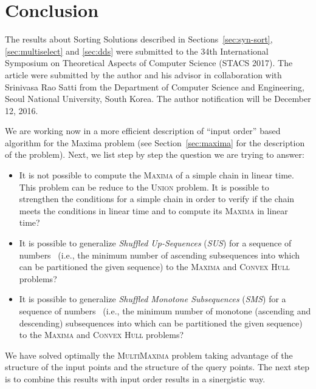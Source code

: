 \section{Conclusion}
\label{sec:con}


The results about Sorting Solutions described in
Sections~\ref{sec:syn-sort}, \ref{sec:multiselect} and \ref{sec:dds}
were submitted to the 34th International Symposium on Theoretical
Aspects of Computer Science (STACS 2017). The article were submitted
by the author and his advisor in collaboration with Srinivasa Rao Satti
from the Department of Computer Science and Engineering, Seoul
National University, South Korea. The author notification will be
December 12, 2016.


We are working now in a more efficient description of ``input order''
based algorithm for the Maxima problem (see Section~\ref{sec:maxima}
for the description of the problem). Next, we list step by step the
question we are trying to answer:

\begin{itemize}
\item It is not possible to compute the \textsc{Maxima} of a simple
  chain in linear time. This problem can be reduce to the
  \textsc{Union} problem. It is possible to strengthen the conditions
  for a simple chain in order to verify if the chain meets the
  conditions in linear time and to compute its \textsc{Maxima} in
  linear time?
\item It is possible to generalize \emph{Shuffled Up-Sequences}
  (\emph{SUS}) for a sequence of
  numbers~\cite{1990-SWAT-SortingShuffledMonotoneSequences-LevcopoulosPetersson}
  (i.e., the minimum number of ascending subsequences into which can
  be partitioned the given sequence) to the \textsc{Maxima} and
  \textsc{Convex Hull} problems?
\item It is possible to generalize \emph{Shuffled Monotone
    Subsequences} (\emph{SMS}) for a sequence of
  numbers~\cite{1990-SWAT-SortingShuffledMonotoneSequences-LevcopoulosPetersson}
  (i.e., the minimum number of monotone (ascending and descending)
  subsequences into which can be partitioned the given sequence) to
  the \textsc{Maxima} and \textsc{Convex Hull} problems?
\end{itemize}

We have solved optimally the \textsc{MultiMaxima} problem taking
advantage of the structure of the input points and the structure of
the query points. The next step is to combine this results with input
order results in a sinergistic way.

